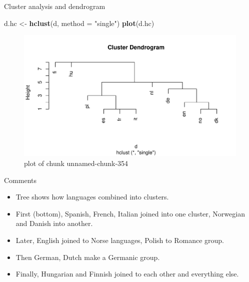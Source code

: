 \documentclass[ignorenonframetext,]{beamer}
\newenvironment{Shaded}{\begin{snugshade}}{\end{snugshade}}
\newcommand{\DataTypeTok}[1]{\textcolor[rgb]{0.13,0.29,0.53}{#1}}
\newcommand{\KeywordTok}[1]{\textcolor[rgb]{0.13,0.29,0.53}{\textbf{#1}}}
\newcommand{\NormalTok}[1]{#1}
\newcommand{\StringTok}[1]{\textcolor[rgb]{0.31,0.60,0.02}{#1}}
\begin{document}
\begin{frame}[fragile]{Cluster analysis and dendrogram}
\protect\hypertarget{cluster-analysis-and-dendrogram}{}

\begin{Shaded}
\begin{Highlighting}[]
\NormalTok{d.hc <-}\StringTok{ }\KeywordTok{hclust}\NormalTok{(d, }\DataTypeTok{method =} \StringTok{"single"}\NormalTok{)}
\KeywordTok{plot}\NormalTok{(d.hc)}
\end{Highlighting}
\end{Shaded}

\begin{figure}
\centering
\includegraphics{figure/unnamed-chunk-354-1.pdf}
\caption{plot of chunk unnamed-chunk-354}
\end{figure}

\end{frame}

\begin{frame}{Comments}
\protect\hypertarget{comments-24}{}

\begin{itemize}
\item
  Tree shows how languages combined into clusters.
\item
  First (bottom), Spanish, French, Italian joined into one cluster,
  Norwegian and Danish into another.
\item
  Later, English joined to Norse languages, Polish to Romance group.
\item
  Then German, Dutch make a Germanic group.
\item
  Finally, Hungarian and Finnish joined to each other and everything
  else.
\end{itemize}

\end{frame}
\end{document}
